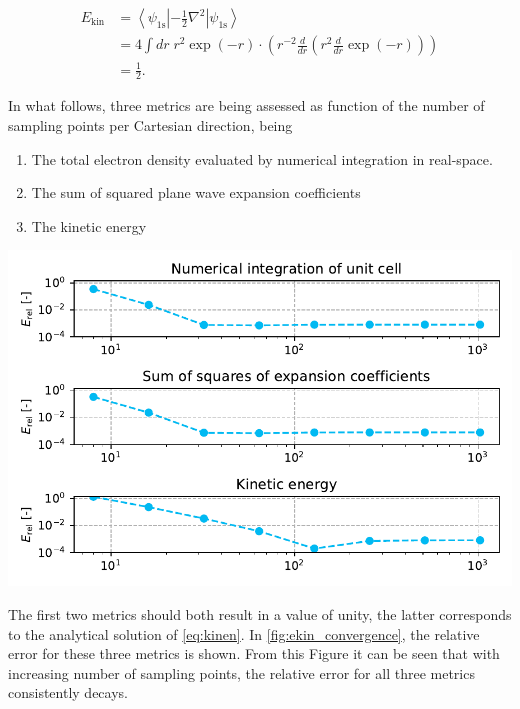 \begin{align}
    E_{\text{kin}} &= \left<\psi_{\text{1s}} \left| -\frac{1}{2} \nabla^{2} \right| \psi_{\text{1s}}\right> \\
    &= 4 \int dr \; r^{2} \exp \left( -r \right) \cdot \left(r^{-2} \frac{d}{dr} \left( r^{2} \frac{d}{dr} \exp \left( -r \right)\right)\right) \\
    &= \frac{1}{2}. \label{eq:kinen}
\end{align}

In what follows, three metrics are being assessed as function of the number of sampling points per Cartesian direction, being

\begin{enumerate}
    \item The total electron density evaluated by numerical integration in real-space.
    \item The sum of squared plane wave expansion coefficients
    \item The kinetic energy
\end{enumerate}

\begin{Figure}
    \centering
    \includegraphics[width=\linewidth]{img/fig4_ekin_convergence.pdf}
    \label{fig:ekin_convergence}
\end{Figure}

The first two metrics should both result in a value of unity, the latter corresponds to the analytical solution of \cref{eq:kinen}. In \cref{fig:ekin_convergence}, the relative error for these three metrics is shown. From this Figure it can be seen that with increasing number of sampling points, the relative error for all three metrics consistently decays.

